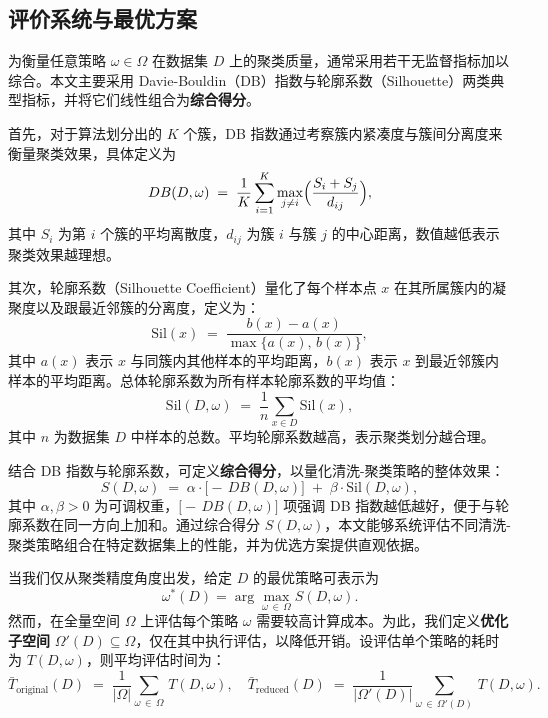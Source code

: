\documentclass[10pt]{article} %
\numberwithin{equation}{section}
\begin{document}
\subsection{评价系统与最优方案}
\label{subsec:evaluation-system}

为衡量任意策略 \(\omega \in \Omega\) 在数据集 \(D\) 上的聚类质量，通常采用若干无监督指标加以综合。本文主要采用 Davie-Bouldin（DB）指数与轮廓系数（Silhouette）两类典型指标，并将它们线性组合为\textbf{综合得分}。

首先，对于算法划分出的 \(K\) 个簇，DB 指数通过考察簇内紧凑度与簇间分离度来衡量聚类效果，具体定义为
\begin{equation}\label{eq:db-score}
  DB(D,\omega)
  \;=\;
  \frac{1}{K}\sum_{i=1}^{K}
  \max_{j\neq i}
  \Bigl(\frac{S_i + S_j}{d_{ij}}\Bigr),
\end{equation}
其中 \(S_i\) 为第 \(i\) 个簇的平均离散度，\(d_{ij}\) 为簇 \(i\) 与簇 \(j\) 的中心距离，数值越低表示聚类效果越理想。

其次，轮廓系数（Silhouette Coefficient）量化了每个样本点 \(x\) 在其所属簇内的凝聚度以及跟最近邻簇的分离度，定义为：
\begin{equation}\label{eq:silhouette}
  \mathrm{Sil}(x)
  \;=\;
  \frac{b(x) - a(x)}{\max\bigl\{a(x),\,b(x)\bigr\}},
\end{equation}
其中 \(a(x)\) 表示 \(x\) 与同簇内其他样本的平均距离，\(b(x)\) 表示 \(x\) 到最近邻簇内样本的平均距离。总体轮廓系数为所有样本轮廓系数的平均值：
\begin{equation}\label{eq:average-silhouette}
  \mathrm{Sil}(D,\omega)
  \;=\;
  \frac{1}{n} \sum_{x \in D} \mathrm{Sil}(x),
\end{equation}
其中 \(n\) 为数据集 \(D\) 中样本的总数。平均轮廓系数越高，表示聚类划分越合理。

结合 DB 指数与轮廓系数，可定义\textbf{综合得分}，以量化清洗-聚类策略的整体效果：
\begin{equation}\label{eq:S-score}
  S(D,\omega)
  \;=\;
  \alpha \cdot \bigl[-\,DB(D,\omega)\bigr]
  \;+\;
  \beta \cdot \mathrm{Sil}(D,\omega),
\end{equation}
其中 \(\alpha,\beta > 0\) 为可调权重，\(\bigl[-\,DB(D,\omega)\bigr]\) 项强调 DB 指数越低越好，便于与轮廓系数在同一方向上加和。通过综合得分 \(S(D,\omega)\)，本文能够系统评估不同清洗-聚类策略组合在特定数据集上的性能，并为优选方案提供直观依据。

当我们仅从聚类精度角度出发，给定 \(D\) 的最优策略可表示为
\begin{equation}\label{eq:best strategy}
  \omega^*(D)
  = \arg\max_{\omega \,\in\, \Omega} S(D,\omega).
\end{equation}
然而，在全量空间 \(\Omega\) 上评估每个策略 \(\omega\) 需要较高计算成本。为此，我们定义\textbf{优化子空间} \(\Omega'(D) \subseteq \Omega\)，仅在其中执行评估，以降低开销。设评估单个策略的耗时为 \(T(D,\omega)\)，则平均评估时间为：
\begin{equation}\label{eq:T-average}
  \bar{T}_{\text{original}}(D)
  \;=\;
  \frac{1}{|\Omega|} \sum_{\omega \,\in\, \Omega} \, T(D,\omega),
\quad
  \bar{T}_{\text{reduced}}(D)
  \;=\;
  \frac{1}{|\Omega'(D)|} \sum_{\omega \,\in\, \Omega'(D)} \, T(D,\omega).
\end{equation}
\end{document}
